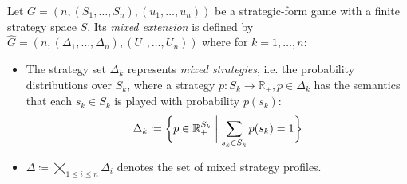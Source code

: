 \documentclass[a4paper]{scrreprt}
\newcommand{\Rp}{\mathbb{R}_+}
\begin{document}
    \begin{defn}
        Let $G = (n, (S_1,\dots, S_n), (u_1, \dots, u_n))$ be a strategic-form game with a finite strategy space $S$. %
        Its \emph{mixed extension} is defined by $\hat{G} = (n, (\Delta_1, \dots, \Delta_n), (U_1, \dots, U_n))$
        where for $k = 1,\dots,n$:
        \begin{itemize} %
%            
%            
            
            \item 
            The strategy set $\Delta_k$ represents \emph{mixed strategies}, i.e. the probability distributions over $S_k$, where a strategy $p : S_k \to \Rp, p \in \Delta_k$ has the semantics that each $s_k \in S_k$ is played with probability $p(s_k)$:   
            \[
                \Delta_k \coloneqq \biggset{ p \in \Rp^{S_k} \biggmid \sum_{s_k \in S_k} p(s_k) = 1 } 
            \]
            
            \item $\Delta \coloneqq \bigtimes\limits_{1\leq i \leq n} \Delta_i$ denotes the set of mixed strategy profiles.
            

\end{itemize}
\end{defn}
\end{document}
